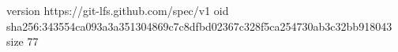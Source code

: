 version https://git-lfs.github.com/spec/v1
oid sha256:343554ca093a3a351304869c7c8dfbd02367c328f5ca254730ab3c32bb918043
size 77
